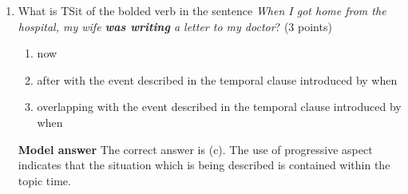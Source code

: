 \documentclass[a4,11pt]{article}
\newcommand{\6}{\mbox{$[\hspace*{-.6mm}[$}}
\newcommand{\9}{\mbox{$]\hspace*{-.6mm}]$}}
\begin{document}
\begin{enumerate}[leftmargin = 12pt]
\begin{enumerate}[noitemsep]
\item now
\item after with the event described in the temporal clause introduced by when
\item overlapping with the event described in  the temporal clause introduced by when
\end{enumerate}

{\bf Model answer} The correct answer is (b).

\item What is TSit of the bolded verb in the sentence \textit{When I got home from the hospital, my wife {\bf was writing} a letter to my doctor}?  (3 points)

\begin{enumerate}[noitemsep]
\item now
\item after with the event described in the temporal clause introduced by when
\item overlapping with the event described in the temporal clause introduced by when
\end{enumerate}


{\bf Model answer} The correct answer is (c). The use of progressive aspect indicates that the situation which is being described is contained within the topic time.


\end{enumerate}
\end{document}
